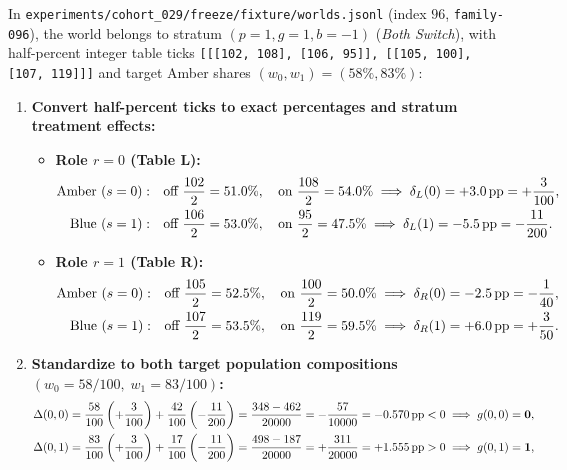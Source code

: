 \begin{workedexample}
In \texttt{experiments/cohort\_029/freeze/fixture/worlds.jsonl} (index $96$, \texttt{family-096}), the world belongs to stratum $(p=1, g=1, b=-1)$ (\emph{Both Switch}), with half-percent integer table ticks \texttt{[[[102, 108], [106, 95]], [[105, 100], [107, 119]]]} and target Amber shares $(w_0, w_1) = (58\%, 83\%)$:
\begin{enumerate}
  \item \textbf{Convert half-percent ticks to exact percentages and stratum treatment effects:}
    \begin{itemize}
      \item \textbf{Role $r=0$ (Table L):}
        \begin{align*}
          \text{Amber } (s=0): &\quad \text{off } \frac{102}{2} = 51.0\%, \quad \text{on } \frac{108}{2} = 54.0\% \implies \delta_{L}(0) = +3.0\,\mathrm{pp} = +\frac{3}{100},\\
          \text{Blue } (s=1):  &\quad \text{off } \frac{106}{2} = 53.0\%, \quad \text{on } \frac{95}{2} = 47.5\%  \implies \delta_{L}(1) = -5.5\,\mathrm{pp} = -\frac{11}{200}.
        \end{align*}
      \item \textbf{Role $r=1$ (Table R):}
        \begin{align*}
          \text{Amber } (s=0): &\quad \text{off } \frac{105}{2} = 52.5\%, \quad \text{on } \frac{100}{2} = 50.0\% \implies \delta_{R}(0) = -2.5\,\mathrm{pp} = -\frac{1}{40},\\
          \text{Blue } (s=1):  &\quad \text{off } \frac{107}{2} = 53.5\%, \quad \text{on } \frac{119}{2} = 59.5\% \implies \delta_{R}(1) = +6.0\,\mathrm{pp} = +\frac{3}{50}.
        \end{align*}
    \end{itemize}
  \item \textbf{Standardize to both target population compositions $(w_0 = 58/100, \; w_1 = 83/100)$:}
    \begin{align*}
      \Delta(0, 0) &= \frac{58}{100}\left(+\frac{3}{100}\right) + \frac{42}{100}\left(-\frac{11}{200}\right) = \frac{348 - 462}{20000} = -\frac{57}{10000} = -0.570\pp < 0 \implies g(0,0) = \mathbf{0},\\
      \Delta(0, 1) &= \frac{83}{100}\left(+\frac{3}{100}\right) + \frac{17}{100}\left(-\frac{11}{200}\right) = \frac{498 - 187}{20000} = +\frac{311}{20000} = +1.555\pp > 0 \implies g(0,1) = \mathbf{1},\\

\end{align*}
\end{enumerate}
\end{workedexample}

